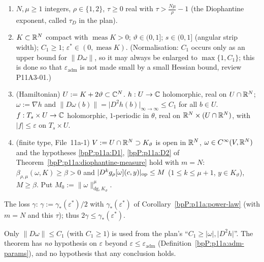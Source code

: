 \begin{assumption}\label{bpP:p11a:sel-data}
\begin{enumerate}[label=(\alph*)]
\item $N,\mu\ge1$ integers, $\rho\in\{1,2\}$, $\tau\ge0$ real with $\tau>\frac{N\mu}\rho-1$ (the Diophantine exponent, called $\tau_D$ in the plan).
\item $K\subset\mathbb{R}^N$ compact with $\operatorname{meas}K>0$; $\vartheta\in(0,1]$; $s\in(0,1]$ (angular strip width); $C_1\ge1$; $\varepsilon^*\in(0,\operatorname{meas}K)$. (Normalisation: $C_1$ occurs only as an upper bound for $\lVert D\omega\rVert$, so it may always be enlarged to $\max\{1,C_1\}$; this is done so that $\varepsilon_{\mathrm{adm}}$ is not made small by a small Hessian bound, review P11A3-01.)
\item (Hamiltonian) $U:=K+2\vartheta\subset\mathbb{C}^N$. $h:U\to\mathbb{C}$ holomorphic, real on $U\cap\mathbb{R}^N$; $\omega:=\nabla h$ and $\lVert D\omega(b)\rVert=\lvert D^2h(b)\rvert_{\infty\to\infty}\le C_1$ for all $b\in U$. $f:T_s\times U\to\mathbb{C}$ holomorphic, $1$-periodic in $\theta$, real on $\mathbb{R}^N\times(U\cap\mathbb{R}^N)$, with $\lvert f\rvert\le\varepsilon$ on $T_s\times U$.
\item (finite type, File~11a-1) $V:=U\cap\mathbb{R}^N\supset K_\vartheta$ is open in $\mathbb{R}^N$, $\omega\in C^\infty(V,\mathbb{R}^N)$ and the hypotheses \ref{bpP:p11a:D1}, \ref{bpP:p11a:D2} of Theorem~\ref{bpP:p11a:diophantine-measure} hold with $m=N$: $\beta_{\rho,\mu}(\omega,K)\ge\beta>0$ and $\lvert D^kg_\rho[\omega](c,y)\rvert_{\mathrm{op}}\le M$ ($1\le k\le\mu+1$, $y\in K_\vartheta$), $M\ge\beta$. Put $M_0:=\lVert\omega\rVert^\mu_{\mathrm{dg},K_\vartheta}$.
\end{enumerate}
The loss $\gamma$: $\gamma:=\gamma_*(\varepsilon^*)/2$ with $\gamma_*(\varepsilon^*)$ of Corollary~\ref{bpP:p11a:power-law} (with $m=N$ and this $\tau$); thus $2\gamma\le\gamma_*(\varepsilon^*)$.
\end{assumption}
Only $\lVert D\omega\rVert\le C_1$ (with $C_1\ge1$) is used from the plan's ``$C_1\ge\lvert\omega\rvert,\lvert D^2h\rvert$''. The theorem has \emph{no} hypothesis on $\varepsilon$ beyond $\varepsilon\le\varepsilon_{\mathrm{adm}}$ (Definition~\ref{bpP:p11a:adm-params}), and no hypothesis that any conclusion holds.

